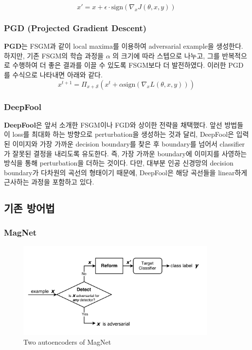 \documentclass{article}
\begin{document}
\[
x' = x + \epsilon \cdot \mathrm{sign}(\nabla_x J(\theta, x, y))
\] 


\subsubsection{PGD (Projected Gradient Descent)}

\textbf{PGD}는 FSGM과 같이 local maxima를 이용하여 adversarial example을 생성한다. 하지만, 기존 FSGM의 학습 과정을 $\alpha$ 의 크기에 따라 스텝으로 나누고, 그를 반복적으로 수행하여 더 좋은 결과를 이끌 수 있도록 FSGM보다 더 발전하였다. 이러한 PGD를 수식으로 나타내면 아래와 같다. \cite{madry2017towards}
\[
x^{t+1} = \Pi_{x + \mathcal{S}} (x^t + \alpha\mathrm{sign}(\nabla_x L(\theta, x, y)))
\]

\subsubsection{DeepFool}

\textbf{DeepFool}은 앞서 소개한 FSGM이나 FGD와 상이한 전략을 채택했다.\cite{moosavi2016deepfool} 앞선 방법들이 loss를 최대화 하는 방향으로 perturbation을 생성하는 것과 달리, DeepFool은 입력된 이미지와 가장 가까운 decision boundary를 찾은 후 boundary를 넘어서 classifier가 잘못된 결정을 내리도록 유도한다. 즉, 가장 가까운 boundary에 이미지를 사영하는 방식을 통해 perturbation을 더하는 것이다. 다만, 대부분 인공 신경망의  decision boundary가 다차원의 곡선의 형태이기 때문에, DeepFool은 해당 곡선들을 linear하게 근사하는 과정을 포함하고 있다.

\subsection{기존 방어법}

\subsubsection{MagNet}

\begin{figure}[h]
    \centering
    \includegraphics[width=10cm]{images/magnet-diagram.png}
    \caption{Two autoencoders of MagNet \cite{carlini2017magnet}}
\end{figure}
\end{document}
